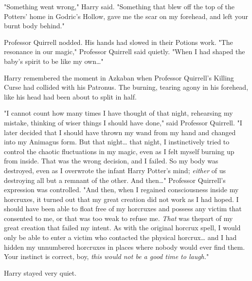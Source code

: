 "Something went wrong," Harry said. "Something that blew off the top of the 
Potters' home in Godric's Hollow, gave me the scar on my forehead, and left 
your burnt body behind."

Professor Quirrell nodded. His hands had slowed in their Potions work. "The 
resonance in our magic," Professor Quirrell said quietly. "When I had shaped 
the baby's spirit to be like my own{\ldots}"

Harry remembered the moment in Azkaban when Professor Quirrell's Killing Curse 
had collided with his Patronus. The burning, tearing agony in his forehead, 
like his head had been about to split in half.

"I cannot count how many times I have thought of that night, rehearsing my 
mistake, thinking of wiser things I should have done," said Professor Quirrell. 
"I later decided that I should have thrown my wand from my hand and changed 
into my Animagus form. But that night{\ldots} that night, I instinctively tried 
to control the chaotic fluctuations in my magic, even as I felt myself burning 
up from inside. That was the wrong decision, and I failed. So my body was 
destroyed, even as I overwrote the infant Harry Potter's mind; \emph{either} of 
us destroying all but a remnant of the other. And then{\ldots}" Professor 
Quirrell's expression was controlled. "And then, when I regained consciousness 
inside my horcruxes, it turned out that my great creation did not work as I had 
hoped. I should have been able to float free of my horcruxes and possess any 
victim that consented to me, or that was too weak to refuse me. \emph{That} was 
thepart of my great creation that failed my intent. As with the original 
horcrux spell, I would only be able to enter a victim who contacted the 
physical horcrux{\ldots} and I had hidden my unnumbered horcruxes in places 
where nobody would ever find them. Your instinct is correct, boy, \emph{this 
would not be a good time to laugh.}"

Harry stayed very quiet.

